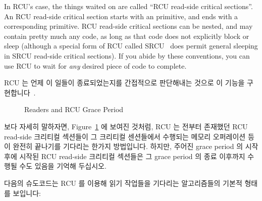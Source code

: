 In RCU's case, the things waited on are called
``RCU read-side critical sections''.
An RCU read-side critical section starts with an
 primitive, and ends with a corresponding
 primitive.
RCU read-side critical sections can be nested, and may contain pretty
much any code, as long as that code does not explicitly block or sleep
(although a special form of RCU called SRCU~\cite{PaulEMcKenney2006c}
does permit general sleeping in SRCU read-side critical sections).
If you abide by these conventions, you can use RCU to wait for \emph{any}
desired piece of code to complete.
\fi

RCU 는 언제 이 일들이 종료되었는지를 간접적으로 판단해내는 것으로 이 기능을
구현합니다~\cite{PaulEMcKenney2007whatisRCU, PaulEMcKenney2007PreemptibleRCU}.

\begin{figure}[tb]
\begin{center}
\end{center}
\caption{Readers and RCU Grace Period}
\label{fig:defer:Readers and RCU Grace Period}
\end{figure}

보다 자세히 말하자면,
Figure~\ref{fig:defer:Readers and RCU Grace Period} 에 보여진 것처럼, RCU 는
전부터 존재했던 RCU read-side 크리티컬 섹션들이 그 크리티컬 센션들에서 수행되는
메모리 오퍼레이션 등이 완전히 끝나기를 기다리는 한가지 방법입니다.
하지만, 주어진 grace period 의 시작 후에 시작된 RCU read-side 크리티컬 섹션들은
그 grace period 의 종료 이후까지 수행될 수도 있음을 기억해 두십시오.

다음의 슈도코드는 RCU 를 이용해 읽기 작업들을 기다리는 알고리즘들의 기본적
형태를 보입니다:

